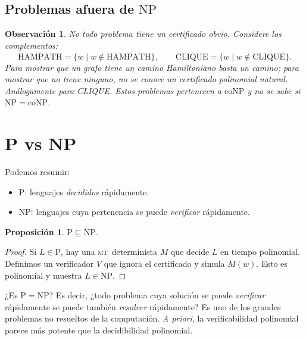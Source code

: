 \documentclass[11pt,a4paper]{article}
\theoremstyle{definicion}
\newtheorem{proposicion}[definicion]{Proposici\'on}
\newtheorem{observacion}[definicion]{Observaci\'on}
\newcommand{\MT}{\textsc{mt}}
\newcommand{\NP}{\mathrm{NP}}
\newcommand{\Pclass}{\mathrm{P}}
\begin{document}
\subsection{Problemas afuera de $\NP$}

\begin{observacion}
No todo problema tiene un certificado obvio. Considere los complementos:
\[
\overline{\mathrm{HAMPATH}} = \{ w \mid w \notin \mathrm{HAMPATH}\}, \qquad
\overline{\mathrm{CLIQUE}} = \{ w \mid w \notin \mathrm{CLIQUE}\}.
\]
Para mostrar que un grafo \emph{tiene} un camino Hamiltoniano basta un camino; para mostrar que \emph{no tiene} ninguno, no se conoce un certificado polinomial natural. An\'alogamente para CLIQUE. Estos problemas pertenecen a $\mathrm{coNP}$ y no se sabe si $\NP = \mathrm{coNP}$.
\end{observacion}

\section{P vs NP}

Podemos resumir:
\begin{itemize}
    \item $\Pclass$: lenguajes \emph{decididos} r\'apidamente.
    \item $\NP$: lenguajes cuya pertenencia se puede \emph{verificar} r\'apidamente.
\end{itemize}

\begin{proposicion}
$\Pclass \subseteq \NP$.
\end{proposicion}

\begin{proof}
Si $L \in \Pclass$, hay una \MT\ determinista $M$ que decide $L$ en tiempo polinomial. Definimos un verificador $V$ que ignora el certificado y simula $M(w)$. Esto es polinomial y muestra $L \in \NP$.
\end{proof}

\begin{tcolorbox}[colback=yellow!10!white, colframe=orange!70!black, title=\textbf{Pregunta abierta: $\Pclass \overset{?}{=} \NP$}, fonttitle=\bfseries]
¿Es $\Pclass = \NP$? Es decir, ¿todo problema cuya soluci\'on se puede \emph{verificar} r\'apidamente se puede tambi\'en \emph{resolver} r\'apidamente? Es uno de los grandes problemas no resueltos de la computaci\'on. \emph{A priori}, la verificabilidad polinomial parece m\'as potente que la decidibilidad polinomial.
\end{tcolorbox}
\end{document}
